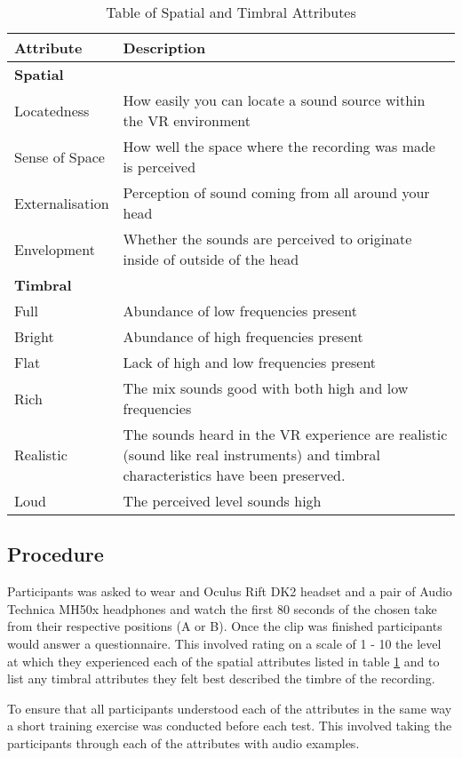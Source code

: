 		\begin{table}[h]
			\begin{tabular}{m{2.2cm} | m{}}
				\textbf{Attribute} & \textbf{Description} \\ \hline
				\multicolumn{2}{l}{\textbf{Spatial}} \\ \hline
				Locatedness & How easily you can locate a sound source within the VR environment \\
				Sense of Space & How well the space where the recording was made is perceived \\
				Externalisation & Perception of sound coming from all around your head \\
				Envelopment & Whether the sounds are perceived to originate inside of outside of the head \\ \hline
				\multicolumn{2}{l}{\textbf{Timbral}} \\ \hline
				Full & Abundance of low frequencies present \\
				Bright & Abundance of high frequencies present \\
				Flat & Lack of high and low frequencies present \\
				Rich & The mix sounds good with both high and low frequencies \\
				Realistic & The sounds heard in the VR experience are realistic (sound like real instruments) and timbral characteristics have been preserved. \\
				Loud & The perceived level sounds high
			\end{tabular}
			\caption{Table of Spatial and Timbral Attributes}
			\label{table:attTable}
		\end{table} 
			

	\subsection{Procedure}

		Participants was asked to wear and Oculus Rift DK2 headset and a pair of Audio Technica MH50x headphones and watch the first 80 seconds of the chosen take from their respective positions (A or B). Once the clip was finished participants would answer a questionnaire. This involved rating on a scale of 1 - 10 the level at which they experienced each of the spatial attributes listed in table \ref{table:attTable} and to list any timbral attributes they felt best described the timbre of the recording. 

		To ensure that all participants understood each of the attributes in the same way a short training exercise was conducted before each test. This involved taking the participants through each of the attributes with audio examples. 
